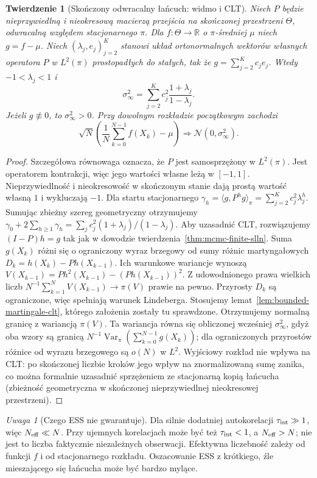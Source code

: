 \documentclass[11pt,a4paper,oneside]{report}
\numberwithin{equation}{chapter}
\theoremstyle{plain}
\newtheorem{twierdzenie}{Twierdzenie}[chapter]
\theoremstyle{definition}
\theoremstyle{remark}
\newtheorem{uwaga}{Uwaga}[chapter]
\newcommand{\R}{\mathbb R}
\newcommand{\Var}{\operatorname{Var}}
\newcommand{\Normal}{\mathcal N}
\begin{document}
\begin{twierdzenie}[Skończony odwracalny łańcuch: widmo i CLT]
\label{thm:mcmc-reversible-clt}
Niech $P$ będzie nieprzywiedlną i nieokresową
macierzą przejścia na skończonej przestrzeni $\Theta$,
odwracalną względem stacjonarnego $\pi$.
Dla $f\colon\Theta\to\R$ o $\pi$-średniej $\mu$ niech
$g=f-\mu$. Niech $(\lambda_j,e_j)_{j=2}^K$
stanowi układ ortonormalnych wektorów własnych
operatora $P$ w $L^2(\pi)$ prostopadłych do stałych,
tak że $g=\sum_{j=2}^Kc_je_j$.
Wtedy $-1<\lambda_j<1$ i
\[
 \sigma_\infty^2
 =\sum_{j=2}^K c_j^2\frac{1+\lambda_j}{1-\lambda_j}.
\]
Jeżeli $g\not\equiv0$, to $\sigma_\infty^2>0$.
Przy \emph{dowolnym} rozkładzie początkowym zachodzi
\[
 \sqrt N\left(\frac1N\sum_{k=0}^{N-1}f(X_k)-\mu\right)
 \Rightarrow\Normal(0,\sigma_\infty^2).
\]
\end{twierdzenie}
\begin{proof}
Szczegółowa równowaga oznacza, że $P$ jest samosprzężony
w $L^2(\pi)$. Jest operatorem kontrakcji, więc jego
wartości własne leżą w $[-1,1]$. Nieprzywiedlność i
nieokresowość w skończonym stanie dają prostą wartość
własną $1$ i wykluczają $-1$.
Dla startu stacjonarnego
$\gamma_h=\langle g,P^hg\rangle_\pi=
\sum_{j=2}^Kc_j^2\lambda_j^h$.
Sumując zbieżny szereg geometryczny otrzymujemy
$\gamma_0+2\sum_{h\ge1}\gamma_h
=\sum_jc_j^2(1+\lambda_j)/(1-\lambda_j)$.
Aby uzasadnić CLT, rozwiązujemy $(I-P)h=g$ tak jak
w dowodzie twierdzenia~\ref{thm:mcmc-finite-slln}.
Suma $g(X_k)$ różni się o ograniczony wyraz brzegowy
od sumy różnic martyngałowych
$D_k=h(X_k)-Ph(X_{k-1})$. Ich warunkowe wariancje
wynoszą $V(X_{k-1})=Ph^2(X_{k-1})-(Ph(X_{k-1}))^2$.
Z udowodnionego prawa wielkich liczb
$N^{-1}\sum_{k=1}^NV(X_{k-1})\to\pi(V)$
prawie na pewno. Przyrosty $D_k$ są ograniczone,
więc spełniają warunek Lindeberga. Stosujemy lemat~\ref{lem:bounded-martingale-clt},
którego założenia zostały tu sprawdzone.
Otrzymujemy normalną granicę z wariancją $\pi(V)$. Ta wariancja
równa się obliczonej wcześniej $\sigma_\infty^2$,
gdyż oba wzory są granicą $N^{-1}\Var_\pi(
\sum_{k=0}^{N-1}g(X_k))$; dla ograniczonych przyrostów
różnice od wyrazu brzegowego są $o(N)$ w $L^2$.
Wyjściowy rozkład nie wpływa na CLT: po skończonej
liczbie kroków jego wpływ na znormalizowaną sumę
zanika, co można formalnie uzasadnić sprzężeniem
ze stacjonarną kopią łańcucha (zbieżność geometryczna
w skończonej nieprzywiedlnej nieokresowej przestrzeni).
\end{proof}

\begin{uwaga}[Czego ESS nie gwarantuje]
Dla silnie dodatniej autokorelacji $\tau_{\rm int}\gg1$,
więc $N_{\rm eff}\ll N$. Przy ujemnych korelacjach
może być też $\tau_{\rm int}<1$, a $N_{\rm eff}>N$;
nie jest to liczba faktycznie niezależnych obserwacji.
Efektywna liczebność zależy od funkcji $f$ i od
stacjonarnego rozkładu. Oszacowanie ESS z krótkiego,
źle mieszającego się łańcucha może być bardzo mylące.
\end{uwaga}
\end{document}
